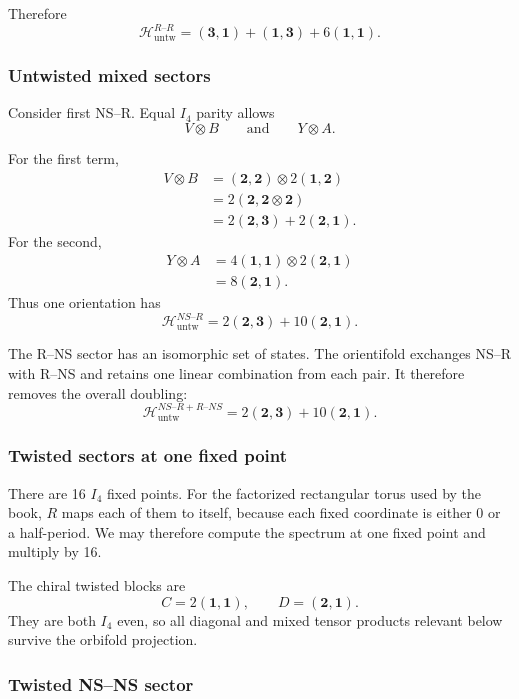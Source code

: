 \documentclass[
  10pt,
  a4paper,
  openany]{book}
\begin{document}
Therefore \[
\boxed{
\mathcal H_{\mathrm{untw}}^{R\text{--}R}
=
(\mathbf3,\mathbf1)
+
(\mathbf1,\mathbf3)
+
6(\mathbf1,\mathbf1)
}.
\]

\subsubsection{Untwisted mixed sectors}\label{untwisted-mixed-sectors}

Consider first NS--R. Equal \(I_4\) parity allows \[
V\otimes B
\qquad\text{and}\qquad
Y\otimes A.
\]

For the first term, \[
\begin{aligned}
V\otimes B
&=
(\mathbf2,\mathbf2)
\otimes
2(\mathbf1,\mathbf2)\\
&=
2(\mathbf2,\mathbf2\otimes\mathbf2)\\
&=
2(\mathbf2,\mathbf3)
+
2(\mathbf2,\mathbf1).
\end{aligned}
\] For the second, \[
\begin{aligned}
Y\otimes A
&=
4(\mathbf1,\mathbf1)
\otimes
2(\mathbf2,\mathbf1)\\
&=
8(\mathbf2,\mathbf1).
\end{aligned}
\] Thus one orientation has \[
\mathcal H_{\mathrm{untw}}^{NS\text{--}R}
=
2(\mathbf2,\mathbf3)
+
10(\mathbf2,\mathbf1).
\]

The R--NS sector has an isomorphic set of states. The orientifold
exchanges NS--R with R--NS and retains one linear combination from each
pair. It therefore removes the overall doubling: \[
\boxed{
\mathcal H_{\mathrm{untw}}^{NS\text{--}R+R\text{--}NS}
=
2(\mathbf2,\mathbf3)
+
10(\mathbf2,\mathbf1)
}.
\]

\subsubsection{Twisted sectors at one fixed
point}\label{twisted-sectors-at-one-fixed-point}

There are 16 \(I_4\) fixed points. For the factorized rectangular torus
used by the book, \(R\) maps each of them to itself, because each fixed
coordinate is either \(0\) or a half-period. We may therefore compute
the spectrum at one fixed point and multiply by 16.

The chiral twisted blocks are \[
C=2(\mathbf1,\mathbf1),
\qquad
D=(\mathbf2,\mathbf1).
\] They are both \(I_4\) even, so all diagonal and mixed tensor products
relevant below survive the orbifold projection.

\subsubsection{Twisted NS--NS sector}\label{twisted-nsns-sector}
\end{document}
